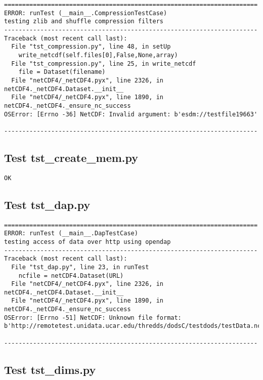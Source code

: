 \begin{verbatim}
======================================================================
ERROR: runTest (__main__.CompressionTestCase)
testing zlib and shuffle compression filters
----------------------------------------------------------------------
Traceback (most recent call last):
  File "tst_compression.py", line 48, in setUp
    write_netcdf(self.files[0],False,None,array)
  File "tst_compression.py", line 25, in write_netcdf
    file = Dataset(filename)
  File "netCDF4/_netCDF4.pyx", line 2326, in netCDF4._netCDF4.Dataset.__init__
  File "netCDF4/_netCDF4.pyx", line 1890, in netCDF4._netCDF4._ensure_nc_success
OSError: [Errno -36] NetCDF: Invalid argument: b'esdm://testfile19663'

----------------------------------------------------------------------
\end{verbatim}

\subsection{Test tst\_create\_mem.py}

\begin{verbatim}
OK
\end{verbatim}

\subsection{Test tst\_dap.py}

\begin{verbatim}
======================================================================
ERROR: runTest (__main__.DapTestCase)
testing access of data over http using opendap
----------------------------------------------------------------------
Traceback (most recent call last):
  File "tst_dap.py", line 23, in runTest
    ncfile = netCDF4.Dataset(URL)
  File "netCDF4/_netCDF4.pyx", line 2326, in netCDF4._netCDF4.Dataset.__init__
  File "netCDF4/_netCDF4.pyx", line 1890, in netCDF4._netCDF4._ensure_nc_success
OSError: [Errno -51] NetCDF: Unknown file format: b'http://remotetest.unidata.ucar.edu/thredds/dodsC/testdods/testData.nc'

----------------------------------------------------------------------
\end{verbatim}

\subsection{Test tst\_dims.py}

